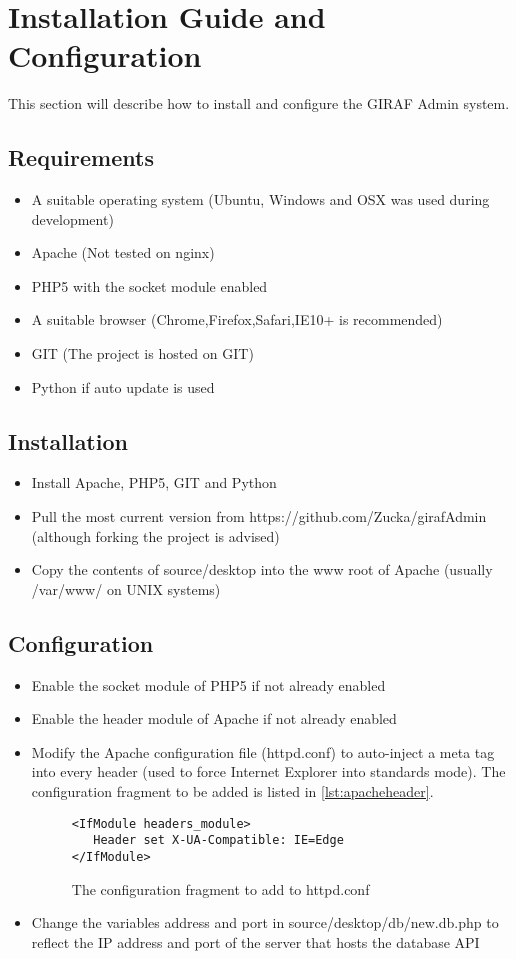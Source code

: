 \chapter{Installation Guide and Configuration}
This section will describe how to install and configure the GIRAF Admin system. 
\section{Requirements}
\begin{itemize}
\item A suitable operating system (Ubuntu, Windows and OSX was used during development)
\item Apache (Not tested on nginx)
\item PHP5 with the socket module enabled
\item A suitable browser (Chrome,Firefox,Safari,IE10+ is recommended)
\item GIT (The project is hosted on GIT)
\item Python if auto update is used
\end{itemize}
\section{Installation}
\begin{itemize}
\item Install Apache, PHP5, GIT and Python
\item Pull the most current version from https://github.com/Zucka/girafAdmin (although forking the project is advised)
\item Copy the contents of source/desktop into the www root of Apache (usually /var/www/ on UNIX systems)
\end{itemize}
\section{Configuration}
\begin{itemize}
\item Enable the socket module of PHP5 if not already enabled
\item Enable the header module of Apache if not already enabled
\item Modify the Apache configuration file (httpd.conf) to auto-inject a meta tag into every header (used to force Internet Explorer into standards mode). The configuration fragment to be added is listed in \autoref{lst:apacheheader}. 
\begin{figure}[htbp]
\begin{lstlisting}
<IfModule headers_module>
   Header set X-UA-Compatible: IE=Edge
</IfModule>
\end{lstlisting}
\caption{The configuration fragment to add to httpd.conf}
\label{lst:apacheheader}
\end{figure}
\item Change the variables address and port in source/desktop/db/new.db.php to reflect the IP address and port of the server that hosts the database API
\end{itemize}
